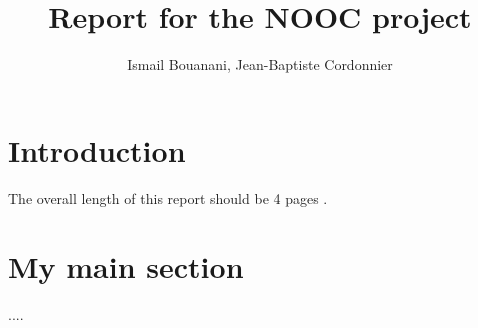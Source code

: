 \documentclass[10pt,journal,a4paper]{IEEEtran}
\begin{document}
%
\title{Report for the NOOC project}
\author{Ismail Bouanani, Jean-Baptiste Cordonnier}
%
% 


\maketitle
\IEEEdisplaynotcompsoctitleabstractindextext

\section{Introduction}

The overall length of this report should be 4 pages \cite{GuoSun}. 


\section{My main section}

....


\end{document}
